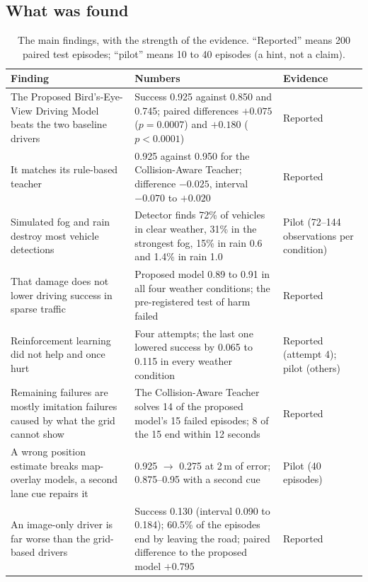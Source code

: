 \subsection{What was found}
\begin{table}[H]\centering\small
\caption{The main findings, with the strength of the evidence. ``Reported'' means 200 paired test episodes; ``pilot'' means 10 to 40 episodes (a hint, not a claim).}\label{tab:findings}
\begin{tabularx}{\textwidth}{@{}>{\raggedright\arraybackslash}p{5.2cm}X>{\raggedright\arraybackslash}p{1.9cm}@{}}\toprule
Finding & Numbers & Evidence\\\midrule
The Proposed Bird's-Eye-View Driving Model beats the two baseline drivers & Success 0.925 against 0.850 and 0.745; paired differences $+0.075$ ($p=0.0007$) and $+0.180$ ($p<0.0001$) & Reported\\
It matches its rule-based teacher & 0.925 against 0.950 for the Collision-Aware Teacher; difference $-0.025$, interval $-0.070$ to $+0.020$ & Reported\\
Simulated fog and rain destroy most vehicle detections & Detector finds 72\% of vehicles in clear weather, 31\% in the strongest fog, 15\% in rain 0.6 and 1.4\% in rain 1.0 & Pilot (72--144 observations per condition)\\
That damage does not lower driving success in sparse traffic & Proposed model 0.89 to 0.91 in all four weather conditions; the pre-registered test of harm failed & Reported\\
Reinforcement learning did not help and once hurt & Four attempts; the last one lowered success by 0.065 to 0.115 in every weather condition & Reported (attempt 4); pilot (others)\\
Remaining failures are mostly imitation failures caused by what the grid cannot show & The Collision-Aware Teacher solves 14 of the proposed model's 15 failed episodes; 8 of the 15 end within 12 seconds & Reported\\
A wrong position estimate breaks map-overlay models, a second lane cue repairs it & 0.925 $\to$ 0.275 at 2\,m of error; 0.875--0.95 with a second cue & Pilot (40 episodes)\\
An image-only driver is far worse than the grid-based drivers & Success 0.130 (interval 0.090 to 0.184); 60.5\% of the episodes end by leaving the road; paired difference to the proposed model $+0.795$ & Reported\\\bottomrule
\end{tabularx}
\end{table}


